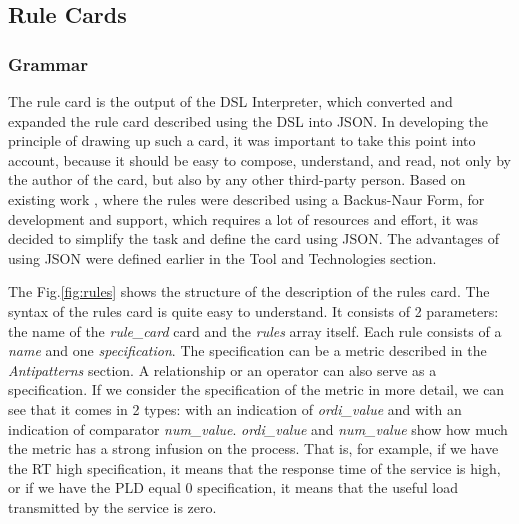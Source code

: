 \documentclass[12pt, times]{article}
\begin{document}
	\subsection{Rule Cards}
	\label{sec:rule-card}
	
	\subsubsection{Grammar}
	
	\hspace*{5mm} The rule card is the output of the DSL Interpreter, which converted and expanded the rule card described using the DSL into JSON. In developing the principle of drawing up such a card, it was important to take this point into account, because it should be easy to compose, understand, and read, not only by the author of the card, but also by any other third-party person. Based on existing work \cite{doc}, where the rules were described using a Backus-Naur Form, for development and support, which requires a lot of resources and effort, it was decided to simplify the task and define the card using JSON. The advantages of using JSON were defined earlier in the Tool and Technologies section. 

	\hspace*{5mm} The Fig.\ref{fig:rules} shows the structure of the description of the rules card. The syntax of the rules card is quite easy to understand. It consists of 2 parameters: the name of the \textit{rule\_card} card and the \textit{rules} array itself. Each rule consists of a \textit{name} and one \textit{specification}. The specification can be a metric described in the \textit{Antipatterns} section. A relationship or an operator can also serve as a specification. If we consider the specification of the metric in more detail, we can see that it comes in 2 types: with an indication of \textit{ordi\_value} and with an indication of comparator\textit{ num\_value}. \textit{ordi\_value }and \textit{num\_value} show how much the metric has a strong infusion on the process. That is, for example, if we have the RT high specification, it means that the response time of the service is high, or if we have the PLD equal 0 specification, it means that the useful load transmitted by the service is zero.
	
\end{document}
